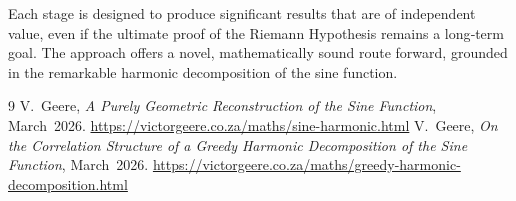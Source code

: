 \documentclass[11pt,a4paper]{article}
\begin{document}
Each stage is designed to produce significant results that are of independent value, even if the ultimate proof of the Riemann Hypothesis remains a long‑term goal. The approach offers a novel, mathematically sound route forward, grounded in the remarkable harmonic decomposition of the sine function.

\begin{thebibliography}{9}
V.~Geere, \emph{A Purely Geometric Reconstruction of the Sine Function},
March~2026. \url{https://victorgeere.co.za/maths/sine-harmonic.html}
V.~Geere, \emph{On the Correlation Structure of a Greedy Harmonic Decomposition of the Sine Function},
March~2026. \url{https://victorgeere.co.za/maths/greedy-harmonic-decomposition.html}
\end{thebibliography}
\end{document}

